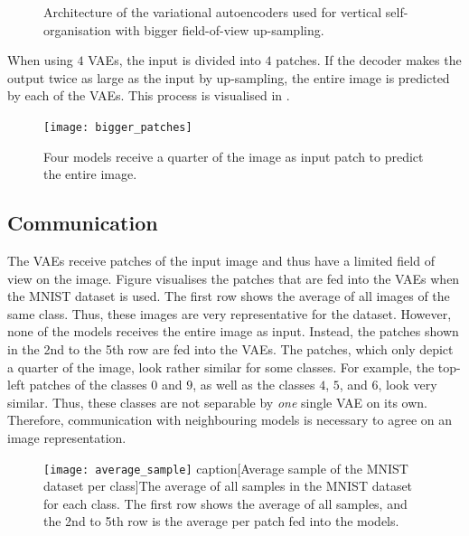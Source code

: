 \begin{figure}[h]
{
}
    \caption[Architecture of the VAEs with bigger field-of-view up-sampling]{Architecture of the variational autoencoders used for vertical self-organisation with bigger field-of-view up-sampling.}
\end{figure}

When using $4$ VAEs, the input is divided into $4$ patches. If the decoder makes the output twice as large as the input by up-sampling,  the entire image is predicted by each of the VAEs. This process is visualised in .

\begin{figure}[h]
    \centering
    \texttt{[image: bigger\_patches]}
    \caption[Reconstruction of bigger output than input patches]{Four models receive a quarter of the image as input patch to predict the entire image.}
\end{figure}



\subsection{Communication}
The VAEs receive patches of the input image and thus have a limited field of view on the image.
Figure  visualises the patches that are fed into the VAEs when the MNIST dataset \cite{Lecun_Bottou_Bengio_Haffner_1998} is used.
The first row shows the average of all images of the same class. Thus, these images are very representative for the dataset.
However, none of the models receives the entire image as input. Instead, the patches shown in the 2nd to the 5th row are fed into the VAEs.
The patches, which only depict a quarter of the image, look rather similar for some classes. For example, the top-left patches of the classes $0$ and $9$, as well as the classes $4$, $5$, and $6$, look very similar.
Thus, these classes are not separable by \emph{one} single VAE on its own.
Therefore, communication with neighbouring models is necessary to agree on an image representation.

\begin{figure}[h]
    \centering
    \texttt{[image: average\_sample]}
    caption[Average sample of the MNIST dataset per class]{The average of all samples in the MNIST dataset for each class. The first row shows the average of all samples, and the 2nd to 5th row is the average per patch fed into the models.}
\end{figure}


